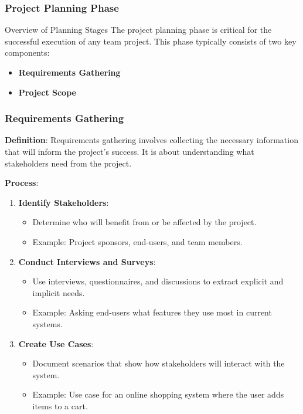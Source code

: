 \documentclass[aspectratio=169]{beamer}
\begin{document}
\begin{frame}[fragile]
    \frametitle{Project Planning Phase}
    
    \begin{block}{Overview of Planning Stages}
        The project planning phase is critical for the successful execution of any team project. This phase typically consists of two key components: 
        \begin{itemize}
            \item \textbf{Requirements Gathering}
            \item \textbf{Project Scope}
        \end{itemize}
    \end{block}
\end{frame}

\begin{frame}[fragile]
    \frametitle{Requirements Gathering}
    
    \textbf{Definition}:
    Requirements gathering involves collecting the necessary information that will inform the project's success. It is about understanding what stakeholders need from the project.
    
    \textbf{Process}:
    \begin{enumerate}
        \item \textbf{Identify Stakeholders}:
        \begin{itemize}
            \item Determine who will benefit from or be affected by the project.
            \item Example: Project sponsors, end-users, and team members.
        \end{itemize}
        
        \item \textbf{Conduct Interviews and Surveys}:
        \begin{itemize}
            \item Use interviews, questionnaires, and discussions to extract explicit and implicit needs.
            \item Example: Asking end-users what features they use most in current systems.
        \end{itemize}
        
        \item \textbf{Create Use Cases}:
        \begin{itemize}
            \item Document scenarios that show how stakeholders will interact with the system.
            \item Example: Use case for an online shopping system where the user adds items to a cart.
        \end{itemize}
    \end{enumerate}
    

\end{frame}
\end{document}
